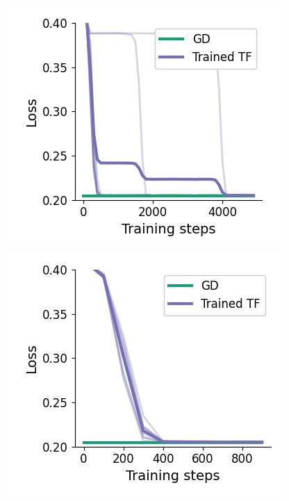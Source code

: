 \documentclass{article}
\theoremstyle{plain}
\theoremstyle{definition}
\theoremstyle{remark}
\begin{document}
\begin{figure}
\begin{center}
\begin{minipage}{.32\textwidth}
 \centering
  \begin{center}
    \includegraphics[width=.9\textwidth]{Final_figures/grokking/1head_10seeds.png}
  \end{center}
\end{minipage}
\begin{minipage}{.32\textwidth}
  \centering
  \begin{center}
    \includegraphics[width=.9\textwidth]{Final_figures/grokking/2heads_10seeds.png}

\end{center}
\end{minipage}
\end{center}
\end{figure}
\end{document}
